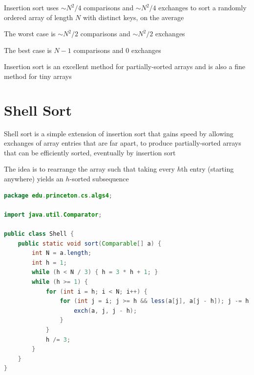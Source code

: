 \documentclass[8pt,a4paper,compress]{beamer}
\begin{document}
\begin{frame}[fragile]
\pause

Insertion sort uses $\sim N^2 /4$ comparisons and $\sim N^2 /4$ exchanges to sort a randomly ordered array of length $N$ with distinct keys, on the average

\pause
\bigskip

The worst case is $\sim N^2 /2$ comparisons and $\sim N^2/2$ exchanges

\pause
\bigskip

The best case is $N-1$ comparisons and 0 exchanges

\pause
\bigskip

Insertion sort is an excellent method for partially-sorted arrays and is also a fine method for tiny arrays
\end{frame}

\section{Shell Sort}
\begin{frame}[fragile]
\pause

Shell sort is a simple extension of insertion sort that gains speed by allowing exchanges of array entries that are far apart, to produce partially-sorted arrays that can be efficiently sorted, eventually by insertion sort

\pause
\bigskip

The idea is to rearrange the array such that taking every $h$th entry (starting anywhere) yields an $h$-sorted subsequence

\pause
\bigskip

\begin{lstlisting}[language=Java]
package edu.princeton.cs.algs4;

import java.util.Comparator;

public class Shell {
    public static void sort(Comparable[] a) {
        int N = a.length; 
        int h = 1;
        while (h < N / 3) { h = 3 * h + 1; }
        while (h >= 1) {
            for (int i = h; i < N; i++) {
                for (int j = i; j >= h && less(a[j], a[j - h]); j -= h) {
                    exch(a, j, j - h);
                }
            }
            h /= 3;
        }    
    }
}
\end{lstlisting}
\end{frame}
\end{document}

